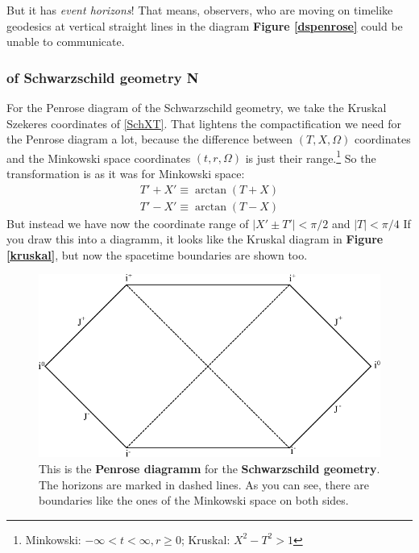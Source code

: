 		But it has \textit{event horizons}! That means, observers, who are moving on timelike geodesics at vertical straight lines in the diagram \textbf{Figure \ref{dspenrose}} could be unable to communicate.
	 
	\subsubsection{of Schwarzschild geometry \textbf{N}}
	
	For the Penrose diagram of the Schwarzschild geometry, we take the Kruskal Szekeres coordinates of \eqref{SchXT}. That lightens the compactification we need for the Penrose diagram a lot, because the difference between $(T,X,\Omega)$ coordinates and the Minkowski space coordinates $(t,r,\Omega)$ is just their range.\footnote{Minkowski: $-\infty < t < \infty, r\geq 0$; Kruskal: $X^2-T^2 > 1$}
	So the transformation is as it was for Minkowski space:
		\begin{equation}
			\begin{split}
			T'+X'\equiv \arctan(T+X) \\
			T'-X'\equiv \arctan(T-X)
			\end{split}		
		\end{equation}
	But instead we have now the coordinate range of $|X'\pm T'|< \pi/2$ and $|T|< \pi/4$ 
	If you draw this into a diagramm, it looks like the Kruskal diagram in \textbf{Figure \ref{kruskal}}, but now the spacetime boundaries are shown too.
		\begin{figure}[tbp]  	
	  	\begin{center}
		\includegraphics[scale=1]{schpenrose}
		\end{center}
		\caption{This is the \textbf{Penrose diagramm} for the \textbf{Schwarzschild geometry}. The horizons are marked in dashed lines. As you can see, there are boundaries like the ones of the Minkowski space on both sides.}
		\end{figure}
	\FloatBarrier

